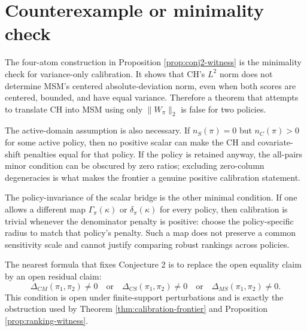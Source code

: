 \documentclass[11pt]{article}
\theoremstyle{definition}
\theoremstyle{plain}
\theoremstyle{remark}
\begin{document}
\section{Counterexample or minimality check}
The four-atom construction in Proposition \ref{prop:conj2-witness} is the minimality
check for variance-only calibration.  It shows that CH's $L^2$ norm does not determine
MSM's centered absolute-deviation norm, even when both scores are centered, bounded,
and have equal variance.  Therefore a theorem that attempts to translate CH into MSM
using only $\|W_\pi\|_2$ is false for two policies.

The active-domain assumption is also necessary.  If $n_S(\pi)=0$ but
$n_C(\pi)>0$ for some active policy, then no positive scalar can make the CH and
covariate-shift penalties equal for that policy.  If the policy is retained anyway,
the all-pairs minor condition can be obscured by zero ratios; excluding zero-column
degeneracies is what makes the frontier a genuine positive calibration statement.

The policy-invariance of the scalar bridge is the other minimal condition.  If one
allows a different map $\Gamma_\pi(\kappa)$ or $\delta_\pi(\kappa)$ for every policy,
then calibration is trivial whenever the denominator penalty is positive:
choose the policy-specific radius to match that policy's penalty.  Such a map does
not preserve a common sensitivity scale and cannot justify comparing robust rankings
across policies.

The nearest formula that fixes Conjecture 2 is to replace the open equality claim by
an open residual claim:
\[
  \Delta_{CM}(\pi_1,\pi_2)\ne0
  \quad\text{or}\quad
  \Delta_{CS}(\pi_1,\pi_2)\ne0
  \quad\text{or}\quad
  \Delta_{MS}(\pi_1,\pi_2)\ne0.
\]
This condition is open under finite-support perturbations and is exactly the obstruction
used by Theorem \ref{thm:calibration-frontier} and Proposition \ref{prop:ranking-witness}.
\end{document}
